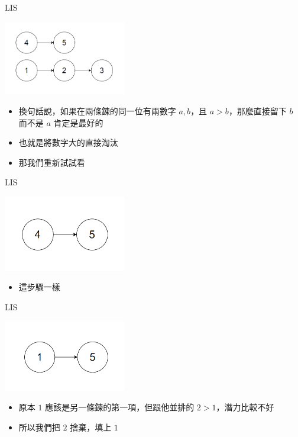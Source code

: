 \documentclass[aspectratio=169]{beamer}
\begin{document}
    \begin{frame}{LIS}
        \begin{center}
            \includegraphics[width=0.4\textwidth]{img/LIS-4.png}
        \end{center}

        \begin{itemize}
            \item 換句話說，如果在兩條鍊的同一位有兩數字 $a, b$，且 $a > b$，那麼直接留下 $b$ 而不是 $a$ 肯定是最好的
            \item 也就是將數字大的直接淘汰
            \item 那我們重新試試看
        \end{itemize}
    \end{frame}

    \begin{frame}{LIS}
        \begin{center}
            \includegraphics[width=0.4\textwidth]{img/LIS-5.png}
        \end{center}

        \begin{itemize}
            \item 這步驟一樣
        \end{itemize}
    \end{frame}

    \begin{frame}{LIS}
        \begin{center}
            \includegraphics[width=0.4\textwidth]{img/LIS-6.png}
        \end{center}

        \begin{itemize}
            \item 原本 $1$ 應該是另一條鍊的第一項，但跟他並排的 $2 > 1$，潛力比較不好
            \item 所以我們把 $2$ 捨棄，填上 $1$
        \end{itemize}
    \end{frame}
\end{document}
